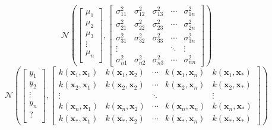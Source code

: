 \documentclass[9pt,hyperref={pdfpagelabels=false},xcolor=table]{beamer}
\begin{document}
\begin{frame}
    \[
        \mathcal{N} \left(
        \begin{bmatrix}
                \mu_1  \\
                \mu_2  \\
                \mu_3  \\
                \vdots \\
                \mu_n  \\
            \end{bmatrix} ,
        \begin{bmatrix}
                \sigma_{11}^2 & \sigma_{12}^2 & \sigma_{13}^2 & \cdots & \sigma_{1n}^2 \\
                \sigma_{21}^2 & \sigma_{22}^2 & \sigma_{23}^2 & \cdots & \sigma_{2n}^2 \\
                \sigma_{31}^2 & \sigma_{32}^2 & \sigma_{33}^2 & \cdots & \sigma_{3n}^2 \\
                \vdots        &               &               & \ddots & \vdots        \\
                \sigma_{n1}^2 & \sigma_{n2}^2 & \sigma_{n3}^2 & \cdots & \sigma_{nn}^2
            \end{bmatrix}
        \right)
    \]
    \vspace{1cm}
    \pause
    \[
        \mathcal{N} \left(
        \begin{bmatrix}
                y_1    \\
                y_2    \\
                \vdots \\
                y_n    \\
                ?      \\
            \end{bmatrix} ,
        \begin{bmatrix}
                k (\bm{x}_1,\bm{x}_1)      & k (\bm{x}_1,\bm{x}_2)      & \cdots & k (\bm{x}_1,\bm{x}_n)      & k (\bm{x}_{1},\bm{x}_{\ast})    \\
                k (\bm{x}_2,\bm{x}_1)      & k (\bm{x}_2,\bm{x}_2)      & \cdots & k (\bm{x}_2,\bm{x}_n)      & k (\bm{x}_{2},\bm{x}_{\ast})    \\
                \vdots                     &                            & \ddots &                            & \vdots                          \\
                k (\bm{x}_n,\bm{x}_1)      & k (\bm{x}_n,\bm{x}_2)      & \cdots & k (\bm{x}_n,\bm{x}_n)      & k (\bm{x}_n,\bm{x}_{\ast})      \\
                k (\bm{x}_{\ast},\bm{x}_1) & k (\bm{x}_{\ast},\bm{x}_2) & \cdots & k (\bm{x}_{\ast},\bm{x}_n) & k (\bm{x}_{\ast},\bm{x}_{\ast})
            \end{bmatrix}
        \right)
    \]
\end{frame}
\end{document}
